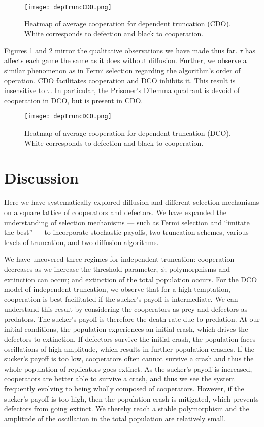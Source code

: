 \documentclass[reprint,aps,pre,twocolumn]{revtex4-1}
\begin{document}
\begin{figure}
\texttt{[image: depTruncCDO.png]}
\caption{Heatmap of average cooperation for dependent truncation (CDO). White corresponds to defection and black to cooperation.}
\label{depTruncCDO}
\end{figure}

Figures \ref{depTruncCDO} and \ref{depTruncDCO} mirror the qualitative observations we have made thus far. $\tau$ has affects each game the same as it does without diffusion. Further, we observe a similar phenomenon as in Fermi selection regarding the algorithm's order of operation. CDO facilitates cooperation and DCO inhibits it. This result is insensitive to $\tau$. In particular, the Prisoner's Dilemma quadrant is devoid of cooperation in DCO, but is present in CDO.

\begin{figure}
\texttt{[image: depTruncDCO.png]}
\caption{Heatmap of average cooperation for dependent truncation (DCO). White corresponds to defection and black to cooperation.}
\label{depTruncDCO}
\end{figure}

\section{Discussion}

Here we have systematically explored diffusion and different selection mechanisms on a square lattice of cooperators and defectors. We have expanded the understanding of selection mechanisms --- such as Fermi selection and ``imitate the best'' --- to incorporate stochastic payoffs, two truncation schemes, various levels of truncation, and two diffusion algorithms.

We have uncovered three regimes for independent truncation: cooperation decreases as we increase the threshold parameter, $\phi$; polymorphisms and extinction can occur; and extinction of the total population occurs. For the DCO model of independent truncation, we observe that for a high temptation, cooperation is best facilitated if the sucker's payoff is intermediate. We can understand this result by considering the cooperators as prey and defectors as predators. The sucker's payoff is therefore the death rate due to predation. At our initial conditions, the population experiences an initial crash, which drives the defectors to extinction. If defectors survive the initial crash, the population faces oscillations of high amplitude, which results in further population crashes. If the sucker's payoff is too low, cooperators often cannot survive a crash and thus the whole population of replicators goes extinct. As the sucker's payoff is increased, cooperators are better able to survive a crash, and thus we see the system frequently evolving to being wholly composed of cooperators. However, if the sucker's payoff is too high, then the population crash is mitigated, which prevents defectors from going extinct. We thereby reach a stable polymorphism and the amplitude of the oscillation in the total population are relatively small.
\end{document}
